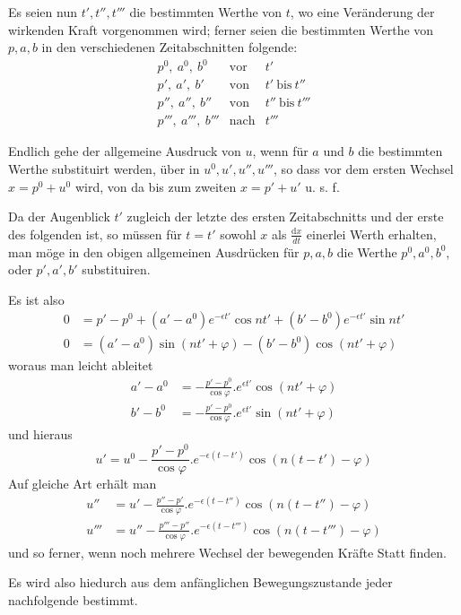 Es seien nun $t',t'',t'''$ die bestimmten Werthe von $t$, wo eine Veränderung der wirkenden Kraft vorgenommen wird; ferner seien die bestimmten Werthe von $p,a,b$ in den verschiedenen Zeitabschnitten folgende:
\[
\begin{array}{lll}
p^0,\ a^0,\ b^0&\text{vor}&t'\\
p',\ a',\ b'&\text{von}&t'\ \text{bis}\ t''\\
p'',\ a'',\ b''&\text{von}&t''\ \text{bis}\ t'''\\
p''',\ a''',\ b'''&\text{nach}&t'''
\end{array}
\]

Endlich gehe der allgemeine Ausdruck von $u$, wenn für $a$ und $b$ die bestimmten Werthe substituirt werden, über in $u^0,u',u'',u'''$, so dass vor dem ersten Wechsel $x=p^0+u^0$ wird, von da bis zum zweiten $x=p'+u'$ u. s. f.

Da der Augenblick $t'$ zugleich der letzte des ersten Zeitabschnitts und der erste des folgenden ist, so müssen für $t=t'$ sowohl $x$ als $\frac{\mathrm{d}x}{dt}$ einerlei Werth erhalten, man möge in den obigen allgemeinen Ausdrücken für $p,a,b$ die Werthe $p^0,a^0,b^0$, oder $p',a',b'$ substituiren.

Es ist also
\[
\begin{aligned}
0&=p'-p^0+(a'-a^0)e^{-\epsilon t'}\cos nt'+(b'-b^0)e^{-\epsilon t'}\sin nt'\\
0&=(a'-a^0)\sin(nt'+\varphi)-(b'-b^0)\cos(nt'+\varphi)
\end{aligned}
\]
woraus man leicht ableitet
\[
\begin{aligned}
a'-a^0&=-\frac{p'-p^0}{\cos\varphi}.e^{\epsilon t'}\cos(nt'+\varphi)\\
b'-b^0&=-\frac{p'-p^0}{\cos\varphi}.e^{\epsilon t'}\sin(nt'+\varphi)
\end{aligned}
\]
und hieraus
\[
u'=u^0-\frac{p'-p^0}{\cos\varphi}.e^{-\epsilon(t-t')}\cos(n(t-t')-\varphi)
\]
Auf gleiche Art erhält man
\[
\begin{aligned}
u''&=u'-\frac{p''-p'}{\cos\varphi}.e^{-\epsilon(t-t'')}\cos(n(t-t'')-\varphi)\\
u'''&=u''-\frac{p'''-p''}{\cos\varphi}.e^{-\epsilon(t-t''')}\cos(n(t-t''')-\varphi)
\end{aligned}
\]
und so ferner, wenn noch mehrere Wechsel der bewegenden Kräfte Statt finden.

\par\clearpage
{}
Es wird also hiedurch aus dem anfänglichen Bewegungszustande jeder nachfolgende bestimmt.

